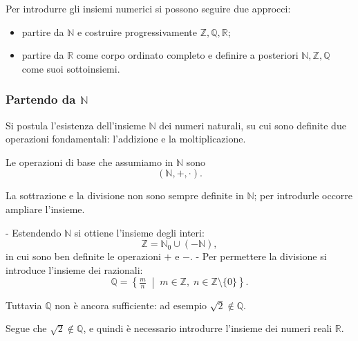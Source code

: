 Per introdurre gli insiemi numerici si possono seguire due approcci:
\begin{itemize}
\item partire da $\mathbb{N}$ e costruire progressivamente $\mathbb{Z}, \mathbb{Q}, \mathbb{R}$;
\item partire da $\mathbb{R}$ come corpo ordinato completo e definire a posteriori $\mathbb{N}, \mathbb{Z}, \mathbb{Q}$ come suoi sottoinsiemi.
\end{itemize}


\subsubsection{Partendo da \texorpdfstring{$\mathbb{N}$}{N}}
Si postula l'esistenza dell'insieme $\mathbb{N}$ dei numeri naturali, su cui sono definite due operazioni fondamentali: l'addizione e la moltiplicazione.


Le operazioni di base che assumiamo in $\mathbb{N}$ sono
\[
(\mathbb{N}, +, \cdot).
\]

La sottrazione e la divisione non sono sempre definite in $\mathbb{N}$; per introdurle occorre ampliare l'insieme.

- Estendendo $\mathbb{N}$ si ottiene l'insieme degli interi:
  \[
  \mathbb{Z} = \mathbb{N}_{0} \cup (-\mathbb{N}),
  \]
  in cui sono ben definite le operazioni $+$ e $-$.
- Per permettere la divisione si introduce l'insieme dei razionali:
  \[
  \mathbb{Q} = \left\{ \tfrac{m}{n} \;\middle|\; m \in \mathbb{Z}, \; n \in \mathbb{Z}\setminus\{0\} \right\}.
  \]

Tuttavia $\mathbb{Q}$ non è ancora sufficiente: ad esempio $\sqrt{2} \notin \mathbb{Q}$.



Segue che $\sqrt{2} \notin \mathbb{Q}$, e quindi è necessario introdurre l'insieme dei numeri reali $\mathbb{R}$.


